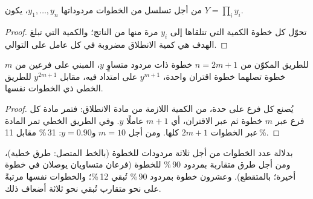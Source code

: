 \begin{proposition}\label{prop:b3:total-synthesis:overall-yield}
من أجل تسلسل من الخطوات مردوداتها $y_1, \dots, y_n$، يكون  $Y = \prod_i y_i$.
\end{proposition}

\begin{proof}
تحوّل كل خطوة الكمية التي تتلقاها إلى $y_i$ مرة منها من الناتج؛ 
والكمية التي تبلغ الهدف هي كمية الانطلاق مضروبة في كل عامل على
التوالي.
\end{proof}

\begin{proposition}[التقارب]\label{prop:b3:total-synthesis:convergent}
للطريق المكوّن من $n = 2m + 1$ خطوة ذات مردود متساوٍ $y$، المبني على فرعين من $m$ خطوة تصلهما
خطوة اقتران واحدة،  $y^{m+1}$ على امتداد  فيه،
مقابل $y^{2m+1}$ للطريق الخطي ذي الخطوات نفسها.
\end{proposition}

\begin{proof}
يُصنع كل فرع على حدة، من الكمية اللازمة من مادة الانطلاق: فتمر
مادة كل فرع عبر $m$ خطوة ثم عبر الاقتران، أي $m + 1$
عاملًا $y$. وفي الطريق الخطي تمر المادة عبر الخطوات $2m + 1$ كلها. ومن أجل $m = 10$
و$y = 0.90$: 31\,\% مقابل 11\,\%.
\end{proof}

\begin{omfigure}

{\small {} بدلالة عدد الخطوات من أجل ثلاثة مردودات للخطوة
(بالخط المتصل: طرق خطية)، ومن أجل طرق متقاربة بمردود 90\,\% للخطوة (فرعان
متساويان يوصلان في خطوة أخيرة؛ بالمتقطع). وعشرون خطوة بمردود 90\,\% تُبقي 12\,\%؛ 
والخطوات نفسها مرتبةً على نحو متقارب تُبقي نحو ثلاثة أضعاف ذلك.}
\end{omfigure}


